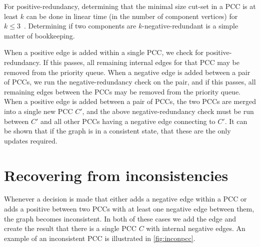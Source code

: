 For positive-redundancy, determining that the minimal size cut-set in a PCC is
  at least $k$ can be done in linear time (in the number of component vertices)
  for $k \leq 3$~\cite{wang_simple_2015}.
Determining if two components are $k$-negative-redundant is a simple matter of
  bookkeeping.


  \kredun{}
%


When a positive edge is added within a single PCC, we check for
  positive-redundancy.
If this passes, all remaining internal edges for that PCC may be  removed from
  the priority queue.
When a negative edge is added between a pair of PCCs, we run the
  negative-redundancy check on the pair, and if this passes, all remaining edges
  between the PCCs may be removed from the priority queue.
When a positive edge is added between a pair of PCCs, the two PCCs are merged
  into a single new PCC $C'$, and the above negative-redundancy check must be
  run between $C'$ and all other PCCs having a negative edge connecting to $C'$.
It can be shown that if the graph is in a consistent state, that these are the
  only updates required.

\section{Recovering from inconsistencies}\label{sec:incon}
Whenever a decision is made that either adds a negative edge within a PCC or
  adds a positive between two PCCs with at least one negative edge between them,
  the graph becomes inconsistent.
In both of these cases we add the edge and create the result that there is a
  single PCC $C$ with internal negative edges.
An example of an inconsistent PCC is illustrated in \cref{fig:inconpcc}.

